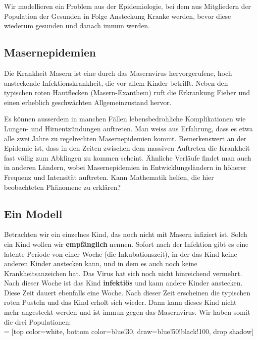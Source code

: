 \documentclass[%
11pt,%
twoside,%
titlepage,%
german,%
headsepline%
]{scrartcl}
\begin{document}
Wir modellieren ein Problem aus der Epidemiologie, bei dem aus Mitgliedern der Population der Gesunden in Folge Ansteckung Kranke werden, bevor diese wiederum gesunden und danach immun werden.

\subsection{Masernepidemien}
Die Krankheit Masern ist eine durch das Masernvirus hervorgerufene, hoch ansteckende Infektionskrankheit, die vor allem Kinder betrifft. Neben den typischen roten Hautflecken (Masern-Exanthem) ruft die Erkrankung Fieber und einen erheblich geschwächten Allgemeinzustand hervor.

Es können ausserdem in manchen Fällen lebensbedrohliche Komplikationen wie Lun\-gen- und Hirnentzündungen auftreten. Man weiss aus Erfahrung, dass es etwa alle zwei Jahre zu regelrechten Masernepidemien kommt. Bemerkenswert an der Epidemie ist, dass in den Zeiten zwischen dem massiven Auftreten die Krankheit fast völlig zum Abklingen zu kommen scheint. Ähnliche Verläufe findet man auch in anderen Ländern, wobei Masernepidemien in Entwicklungsländern in höherer Frequenz und Intensität auftreten. Kann Mathematik helfen, die hier beobachteten Phänomene zu erklären?

\subsection{Ein Modell}
Betrachten wir ein einzelnes Kind, das noch nicht mit Masern infiziert ist. Solch ein Kind wollen wir \textbf{empfänglich} nennen. Sofort nach der Infektion gibt es eine latente Periode von einer Woche (die Inkubationszeit), in der das Kind keine anderen Kinder anstecken kann, und in dem es auch noch keine Krankheitsanzeichen hat. Das Virus hat sich noch nicht hinreichend vermehrt. Nach dieser Woche ist das Kind \textbf{infektiös} und kann andere Kinder anstecken. Diese Zeit dauert ebenfalls eine Woche. Nach dieser Zeit erscheinen die typischen roten Pusteln und das Kind erholt sich wieder. Dann kann dieses Kind nicht mehr angesteckt werden und ist immun gegen das Masernvirus. Wir haben somit die drei Populationen:\\

 = [top color=white, bottom color=blue!30, 
                            draw=blue!50!black!100, drop shadow]
\end{document}
